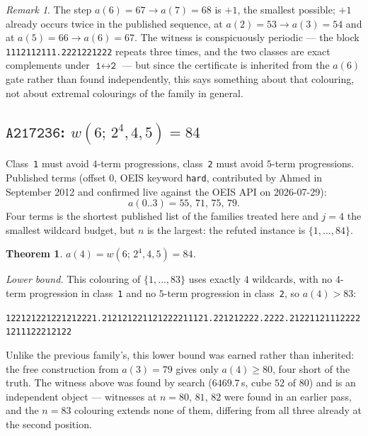 \documentclass[12pt]{article}
\newtheorem{theorem}{Theorem}
\theoremstyle{remark}
\newtheorem{remark}{Remark}
\newcommand{\seq}[1]{\texttt{#1}}
\begin{document}
\begin{remark}
The step $a(6)=67 \to a(7)=68$ is $+1$, the smallest possible; $+1$ already
occurs twice in the published sequence, at $a(2)=53 \to a(3)=54$ and at
$a(5)=66 \to a(6)=67$. The witness is conspicuously periodic --- the block
\texttt{1112112111.2221221222} repeats three times, and the two classes are
exact complements under $\texttt{1} \leftrightarrow \texttt{2}$ --- but
since the certificate is inherited from the $a(6)$ gate rather than found
independently, this says something about that colouring, not about extremal
colourings of the family in general.
\end{remark}

\subsection{$\seq{A217236}$: $w(6;\,2^{4},4,5)=84$}\label{sec:a217236}

Class~\texttt{1} must avoid $4$-term progressions, class~\texttt{2} must
avoid $5$-term progressions. Published terms (offset $0$, OEIS keyword
\texttt{hard}, contributed by Ahmed in September 2012 and confirmed live
against the OEIS API on 2026-07-29):
\[
a(0..3) = 55,\,71,\,75,\,79 .
\]
Four terms is the shortest published list of the families treated here and
$j=4$ the smallest wildcard budget, but $n$ is the largest: the refuted
instance is $\{1,\dots,84\}$.

\begin{theorem}\label{thm:a217236}
$a(4) = w(6;\,2^{4},4,5) = 84$.
\end{theorem}

\emph{Lower bound.} This colouring of $\{1,\dots,83\}$ uses exactly $4$
wildcards, with no $4$-term progression in class~\texttt{1} and no $5$-term
progression in class~\texttt{2}, so $a(4) > 83$:

\begin{center}\small
\texttt{122121221221212221.212121221121222211121.221212222.2222.212211211122221211122212122}
\end{center}

\noindent Unlike the previous family's, this lower bound was earned rather
than inherited: the free construction from $a(3)=79$ gives only
$a(4) \ge 80$, four short of the truth. The witness above was found by
search ($6469.7$\,s, cube $52$ of $80$) and is an independent object ---
witnesses at $n=80$, $81$, $82$ were found in an earlier pass, and the
$n=83$ colouring extends none of them, differing from all three already at
the second position.
\end{document}
